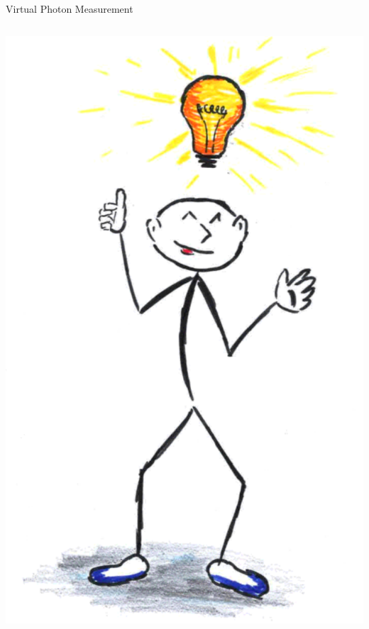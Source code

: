 \documentclass[aspectratio=169,10pt]{beamer}
\begin{document}
\begin{frame}{Virtual Photon Measurement}
\begin{columns}
\begin{column}{4.5cm}
       \includegraphics[width=\textwidth]{general/idea.pdf}
      \end{column}
    \end{columns}
  \end{frame}
\end{document}
